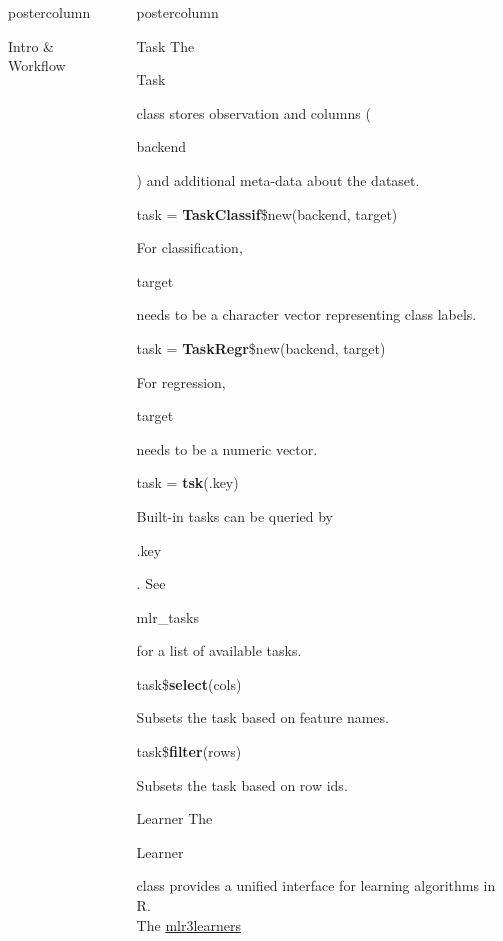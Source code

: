 \documentclass{beamer}
\newlength{\columnheight} %
\newcommand{\codeinline}[1]{\begin{codeboxinline}#1\end{codeboxinline}}
\begin{document}
\begin{frame}[fragile]{}
\begin{columns}
\begin{column}{.245\textwidth}
\begin{beamercolorbox}[center]{postercolumn}
\begin{minipage}{.98\textwidth}
{\begin{myblock}{Intro \& Workflow}
						\end{myblock}
					}
				\end{minipage}
			\end{beamercolorbox}
		\end{column}
		\begin{column}{.245\textwidth}
			\begin{beamercolorbox}[center]{postercolumn}
				\begin{minipage}{.98\textwidth}
					\parbox[t][\columnheight]{\textwidth}{
						\begin{myblock}{Task}
							The \codeinline{Task} class stores observation and columns (\codeinline{backend}) and additional
							meta-data about the dataset.
							\vspace{1em}
							\\
							\begin{codebox}
								task = \textbf{TaskClassif}\$new(backend, target)
							\end{codebox}
							For classification, \codeinline{target} needs to be a character vector representing class labels.
							\\
							\begin{codebox}
								task = \textbf{TaskRegr}\$new(backend, target)
							\end{codebox}
							For regression, \codeinline{target} needs to be a numeric vector.
							\\
							\begin{codebox}
								task = \textbf{tsk}(.key)
							\end{codebox}
							Built-in tasks can be queried by \codeinline{.key}.
							See \codeinline{mlr\_tasks} for a list of available tasks.
							\vspace{1em}
							\\
							\begin{codebox}
								task\$\textbf{select}(cols)
							\end{codebox}
							Subsets the task based on feature names.
							\\
							\begin{codebox}
								task\$\textbf{filter}(rows)
							\end{codebox}
							Subsets the task based on row ids.
						\end{myblock}
						\begin{myblock}{Learner}
						The \codeinline{Learner} class provides a unified interface for
						learning algorithms in R. 
						\\The \href{https://github.com/mlr-org/mlr3learners}{mlr3learners
}
\end{myblock}}
\end{minipage}
\end{beamercolorbox}
\end{column}
\end{columns}
\end{frame}
\end{document}
